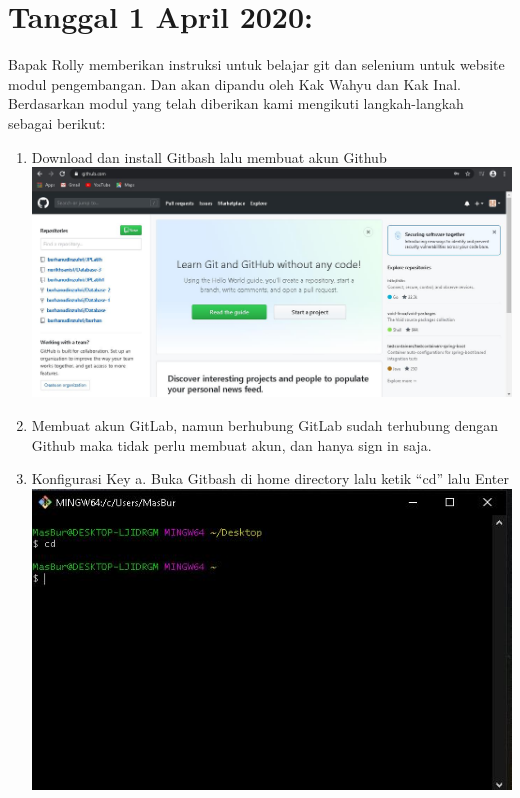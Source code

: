\documentclass{article}
\begin{document}
\section{Tanggal 1 April 2020:}
Bapak Rolly memberikan instruksi untuk belajar git dan selenium untuk website modul pengembangan. Dan akan dipandu oleh Kak Wahyu dan Kak Inal. Berdasarkan modul yang telah diberikan kami mengikuti langkah-langkah sebagai berikut:
    \newline
    \newline
     \begin{enumerate}
        \item Download dan install  Gitbash lalu membuat akun Github
	            \newline
	            \includegraphics[scale=0.3]{32.1.jpg}
	            \newline
        \item Membuat akun GitLab, namun berhubung GitLab sudah terhubung dengan Github maka tidak perlu membuat akun, dan hanya sign in saja.
	        	\newline
       	\item Konfigurasi Key
                \newline
        	a. Buka Gitbash di home directory lalu ketik “cd” lalu Enter
                \newline
                \includegraphics[scale=0.5]{32.3a.jpg}

\end{enumerate}
\end{document}
